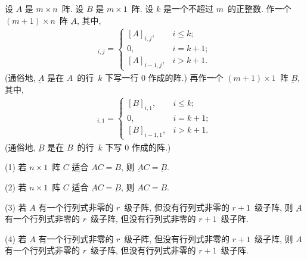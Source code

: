 \documentclass[../libro.tex]{subfiles}
\begin{document}
\begin{theorem}[\(0\) 的作用]
    设 \(A\) 是 \(m \times n\)~阵.
    设 \(B\) 是 \(m \times 1\)~阵.
    设 \(k\) 是一个不超过 \(m\)~的正整数.
    作一个 \((m + 1) \times n\)~阵 \(\underbar{A}\),
    其中,
    \begin{align*}
        [\underbar{A}]_{i,j} =
        \begin{cases}
            [A]_{i,j},   & i \leq k;  \\
            0,           & i = k + 1; \\
            [A]_{i-1,j}, & i > k + 1.
        \end{cases}
    \end{align*}
    (通俗地, \(\underbar{A}\)
    是在 \(A\)~的行~\(k\) 下写一行 \(0\) 作成的阵.)
    再作一个 \((m + 1) \times 1\)~阵 \(\underbar{B}\),
    其中,
    \begin{align*}
        [\underbar{B}]_{i,1} =
        \begin{cases}
            [B]_{i,1},   & i \leq k;  \\
            0,           & i = k + 1; \\
            [B]_{i-1,1}, & i > k + 1.
        \end{cases}
    \end{align*}
    (通俗地, \(\underbar{B}\)
    是在 \(B\)~的行~\(k\) 下写 \(0\) 作成的阵.)

    (1)
    若 \(n \times 1\)~阵 \(C\) 适合
    \(AC = B\),
    则 \(\underbar{A}C = \underbar{B}\).

    (2)
    若 \(n \times 1\)~阵 \(C\) 适合
    \(\underbar{A}C = \underbar{B}\),
    则 \(AC = B\).

    (3)
    若 \(A\) 有一个行列式非零的 \(r\)~级子阵,
    但没有行列式非零的 \(r+1\)~级子阵,
    则 \(\underbar{A}\) 有一个行列式非零的 \(r\)~级子阵,
    但没有行列式非零的 \(r+1\)~级子阵.

    (4)
    若 \(\underbar{A}\) 有一个行列式非零的 \(r\)~级子阵,
    但没有行列式非零的 \(r+1\)~级子阵,
    则 \(A\) 有一个行列式非零的 \(r\)~级子阵,
    但没有行列式非零的 \(r+1\)~级子阵.
\end{theorem}
\end{document}

